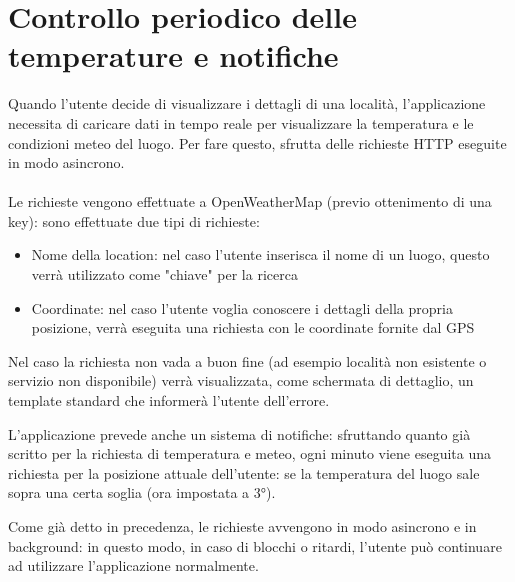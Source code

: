 \documentclass[twoside]{supsistudent}
\begin{document}
\section{Controllo periodico delle temperature e notifiche}
Quando l'utente decide di visualizzare i dettagli di una località, l'applicazione necessita di caricare dati in tempo reale per visualizzare la temperatura e le condizioni meteo del luogo. Per fare questo, sfrutta delle richieste HTTP eseguite in modo asincrono.
\\\\
Le richieste vengono effettuate a OpenWeatherMap (previo ottenimento di una key): sono effettuate due tipi di richieste:
\begin{itemize}
	\item Nome della location: nel caso l'utente inserisca il nome di un luogo, questo verrà utilizzato come "chiave" per la ricerca
	\item Coordinate: nel caso l'utente voglia conoscere i dettagli della propria posizione, verrà eseguita una richiesta con le coordinate fornite dal GPS
\end{itemize}

Nel caso la richiesta non vada a buon fine (ad esempio località non esistente o servizio non disponibile) verrà visualizzata, come schermata di dettaglio, un template standard che informerà l'utente dell'errore.

L'applicazione prevede anche un sistema di notifiche: sfruttando quanto già scritto per la richiesta di temperatura e meteo, ogni minuto viene eseguita una richiesta per la posizione attuale dell'utente: se la temperatura del luogo sale sopra una certa soglia (ora impostata a \ang{3}).

Come già detto in precedenza, le richieste avvengono in modo asincrono e in background: in questo modo, in caso di blocchi o ritardi, l'utente può continuare ad utilizzare l'applicazione normalmente.
\end{document}
